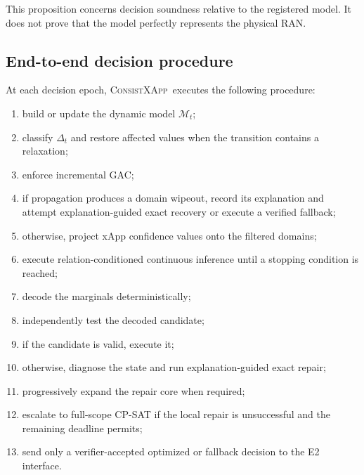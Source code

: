 \documentclass[pdflatex,sn-mathphys-num,iicol,oneside]{sn-jnl}
\newcommand{\method}{\textsc{ConsistXApp}}
\begin{document}
This proposition concerns decision soundness relative to the
registered model. It does not prove that the model perfectly
represents the physical RAN.

\subsection{End-to-end decision procedure}

At each decision epoch, \method\ executes the following procedure:

\begin{enumerate}
    \item build or update the dynamic model $\mathcal{M}_t$;

    \item classify $\Delta_t$ and restore affected values when the
    transition contains a relaxation;

    \item enforce incremental GAC;

    \item if propagation produces a domain wipeout, record its
    explanation and attempt explanation-guided exact recovery or
    execute a verified fallback;

    \item otherwise, project xApp confidence values onto the filtered
    domains;

    \item execute relation-conditioned continuous inference until a
    stopping condition is reached;

    \item decode the marginals deterministically;

    \item independently test the decoded candidate;

    \item if the candidate is valid, execute it;

    \item otherwise, diagnose the state and run explanation-guided
    exact repair;

    \item progressively expand the repair core when required;

    \item escalate to full-scope CP-SAT if the local repair is
    unsuccessful and the remaining deadline permits;

    \item send only a verifier-accepted optimized or fallback decision
    to the E2 interface.
\end{enumerate}
\end{document}
